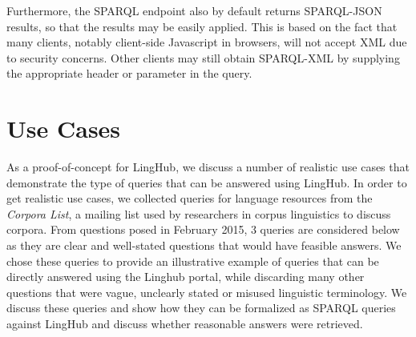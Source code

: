 \documentclass{acm_proc_article-sp}
\begin{document}
Furthermore, the SPARQL endpoint also by default returns SPARQL-JSON
results\cite{seaborne2013sparql}, so that the results may be easily applied. This is based on the
fact that many clients, notably client-side Javascript in browsers, will not
accept XML due to security concerns. Other clients may still obtain SPARQL-XML
by supplying the appropriate header or parameter in the query.

\section{Use Cases}

\label{sec:usecases}

As a proof-of-concept for LingHub, we discuss a number of realistic use cases
that demonstrate the type of queries that can be answered using LingHub. In
order to get realistic use cases, we collected queries for language resources
from the \emph{Corpora List}, a mailing list used by researchers in corpus
linguistics to discuss corpora. From questions posed in February 2015, 3 queries 
are considered below as they are clear and well-stated questions that would have
feasible answers. We chose these queries to provide an illustrative example of
queries that can be directly answered using the Linghub portal, while discarding
many other questions that were vague, unclearly stated or misused linguistic
terminology.
We discuss these queries and show how they can be formalized as
SPARQL queries against LingHub and discuss whether reasonable answers were
retrieved.
\end{document}
